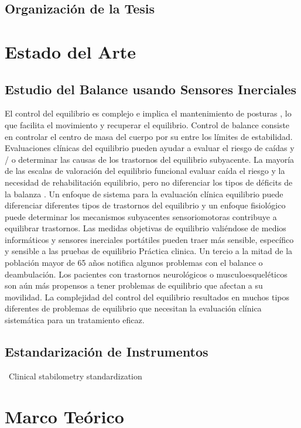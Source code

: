 \documentclass[12pt,a4paper]{article}
\begin{document}
\subsection{Organizaci\'on de la Tesis}



\section{Estado del Arte}
\subsection{Estudio del Balance usando Sensores Inerciales}
El control del equilibrio es complejo e implica el mantenimiento de posturas \cite{mancini_relevance_2010}, lo que facilita el movimiento y recuperar el equilibrio. Control de balance consiste en controlar el centro de masa del cuerpo  por su entre los límites de estabilidad. Evaluaciones clínicas del equilibrio pueden ayudar a evaluar el riesgo de caídas y / o determinar las causas de los trastornos del equilibrio subyacente. 
La mayoría de las escalas de valoración del equilibrio funcional evaluar caída
el riesgo y la necesidad de rehabilitación equilibrio, pero no diferenciar los tipos de déficits de la balanza . Un enfoque de sistema para la evaluación clínica equilibrio puede diferenciar diferentes tipos de trastornos del equilibrio y un enfoque fisiológico puede determinar los mecanismos subyacentes sensoriomotoras contribuye a equilibrar trastornos. Las medidas objetivas de equilibrio valiéndose de medios informáticos y sensores inerciales portátiles pueden traer más sensible, específico y sensible a las pruebas de equilibrio Práctica clinica.
Un tercio a la mitad de la población mayor de 65 años notifica algunos problemas con el balance o
deambulación. Los pacientes con trastornos neurológicos o musculoesqueléticos son aún más propensos a tener problemas de equilibrio que afectan a su movilidad. La complejidad del control del equilibrio resultados en muchos tipos diferentes de problemas de equilibrio que necesitan la evaluación clínica sistemática para un tratamiento eficaz.

\subsection{Estandarización de Instrumentos}
\
Clinical stabilometry standardization\cite{scoppa_clinical_2013}



\section{Marco Teórico}
\end{document}
